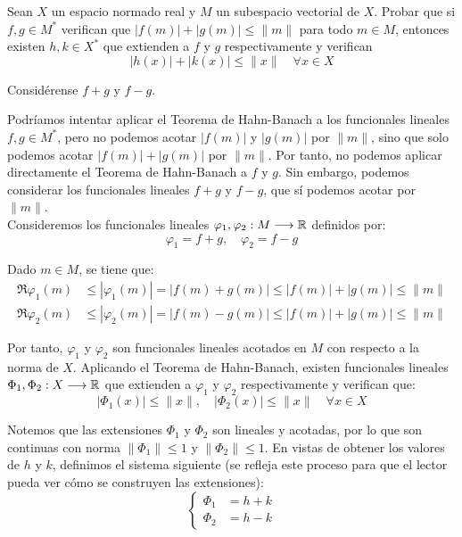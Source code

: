 \begin{ejercicio}
    Sean $X$ un espacio normado real y $M$ un subespacio vectorial de $X$. Probar que si $f, g \in M^*$ verifican que $|f(m)| + |g(m)| \leq \|m\|$ para todo $m \in M$, entonces existen $h, k \in X^*$ que extienden a $f$ y $g$ respectivamente y verifican
    \[
        |h(x)| + |k(x)| \leq \|x\| \quad \forall x \in X
    \]
    \begin{observacion}
        Considérense $f + g$ y $f - g$.
    \end{observacion}

    Podríamos intentar aplicar el Teorema de Hahn-Banach a los funcionales lineales $f, g \in M^*$, pero no podemos acotar $|f(m)|$ y $|g(m)|$ por $\|m\|$, sino que solo podemos acotar $|f(m)| + |g(m)|$ por $\|m\|$. Por tanto, no podemos aplicar directamente el Teorema de Hahn-Banach a $f$ y $g$. Sin embargo, podemos considerar los funcionales lineales $f + g$ y $f - g$, que sí podemos acotar por $\|m\|$.\\

    Consideremos los funcionales lineales $\varphi_1, \varphi_2: M \longrightarrow \mathbb{R}$ definidos por:
    \begin{equation*}
        \varphi_1 = f + g, \quad \varphi_2 = f - g
    \end{equation*}

    Dado $m \in M$, se tiene que:
    \begin{align*}
        \Re \varphi_1(m) &\leq |\varphi_1(m)| = |f(m) + g(m)| \leq |f(m)| + |g(m)| \leq \|m\| \\
        \Re \varphi_2(m) &\leq |\varphi_2(m)| = |f(m) - g(m)| \leq |f(m)| + |g(m)| \leq \|m\|
    \end{align*}

    Por tanto, $\varphi_1$ y $\varphi_2$ son funcionales lineales acotados en $M$ con respecto a la norma de $X$. Aplicando el Teorema de Hahn-Banach, existen funcionales lineales $\Phi_1, \Phi_2: X \longrightarrow \mathbb{R}$ que extienden a $\varphi_1$ y $\varphi_2$ respectivamente y verifican que:
    \begin{equation*}
        |\Phi_1(x)| \leq \|x\|, \quad |\Phi_2(x)| \leq \|x\| \quad \forall x \in X
    \end{equation*}

    Notemos que las extensiones $\Phi_1$ y $\Phi_2$ son lineales y acotadas, por lo que son continuas con norma $\|\Phi_1\| \leq 1$ y $\|\Phi_2\| \leq 1$. En vistas de obtener los valores de $h$ y $k$, definimos el sistema siguiente (se refleja este proceso para que el lector pueda ver cómo se construyen las extensiones):
    \begin{equation*}
        \begin{cases}
            \Phi_1 &= h + k \\
            \Phi_2 &= h - k
        \end{cases}
    \end{equation*}


\end{ejercicio}
